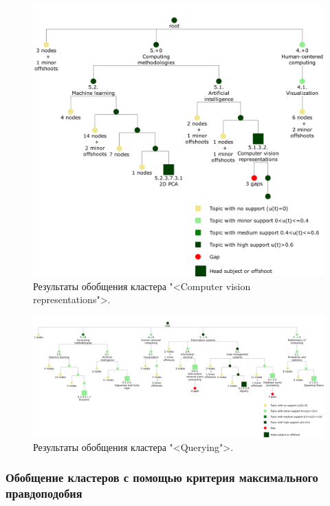\documentclass[12pt]{article}
\begin{document}
\begin{figure}
	\centering
	\vspace{-2cm}
	\includegraphics[width=0.8\textheight, angle=90, origin=c, clip]{images/cluster_lift_tree_11_cv_representations}
	\caption{Результаты обобщения кластера "<Computer vision representations">.}
	\label{fig:tax_cv_representations}
\end{figure}
\begin{figure}
	\centering
	\vspace{-2cm}
	\includegraphics[width=\textheight, angle=90, origin=c, clip]{images/cluster_lift_tree_20_querying}
	\caption{Результаты обобщения кластера "<Querying">.}
	\label{fig:tax_querying}
\end{figure}

\clearpage
\subsubsection{Обобщение кластеров с помощью критерия максимального правдоподобия}
\end{document}
